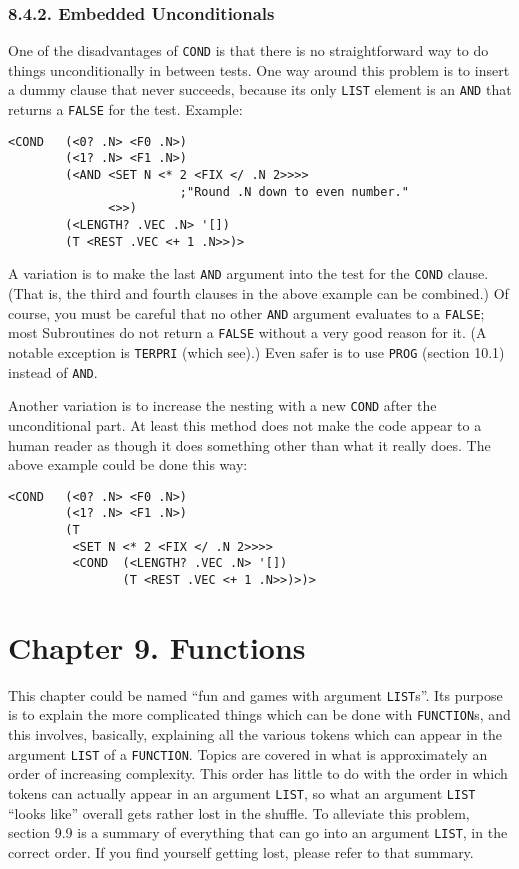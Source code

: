 \documentclass[a4paper,]{article}
\begin{document}
\subsubsection{8.4.2. Embedded Unconditionals}\label{embedded-unconditionals}

One of the disadvantages of \texttt{COND} is that there is no straightforward way to do things unconditionally in between
tests. One way around this problem is to insert a dummy clause that never succeeds, because its only \texttt{LIST} element
is an \texttt{AND} that returns a \texttt{FALSE} for the test. Example:

\begin{verbatim}
<COND   (<0? .N> <F0 .N>)
        (<1? .N> <F1 .N>)
        (<AND <SET N <* 2 <FIX </ .N 2>>>>
                        ;"Round .N down to even number."
              <>>)
        (<LENGTH? .VEC .N> '[])
        (T <REST .VEC <+ 1 .N>>)>
\end{verbatim}

A variation is to make the last \texttt{AND} argument into the test for the \texttt{COND} clause. (That is, the third and
fourth clauses in the above example can be combined.) Of course, you must be careful that no other \texttt{AND} argument
evaluates to a \texttt{FALSE}; most Subroutines do not return a \texttt{FALSE} without a very good reason for it. (A
notable exception is \texttt{TERPRI} (which see).) Even safer is to use \texttt{PROG} (section 10.1) instead of
\texttt{AND}.

Another variation is to increase the nesting with a new \texttt{COND} after the unconditional part. At least this method
does not make the code appear to a human reader as though it does something other than what it really does. The above
example could be done this way:

\begin{verbatim}
<COND   (<0? .N> <F0 .N>)
        (<1? .N> <F1 .N>)
        (T
         <SET N <* 2 <FIX </ .N 2>>>>
         <COND  (<LENGTH? .VEC .N> '[])
                (T <REST .VEC <+ 1 .N>>)>)>
\end{verbatim}

\section{Chapter 9. Functions}\label{chapter-9.-functions}

This chapter could be named ``fun and games with argument \texttt{LIST}s''. Its purpose is to explain the more complicated
things which can be done with \texttt{FUNCTION}s, and this involves, basically, explaining all the various tokens which can
appear in the argument \texttt{LIST} of a \texttt{FUNCTION}. Topics are covered in what is
approximately an order of increasing complexity. This order has little to do with the order in which tokens can actually
appear in an argument \texttt{LIST}, so what an argument \texttt{LIST} ``looks like'' overall gets rather lost in the
shuffle. To alleviate this problem, section 9.9 is a summary of everything that can go into an argument \texttt{LIST}, in
the correct order. If you find yourself getting lost, please refer to that summary.
\end{document}
